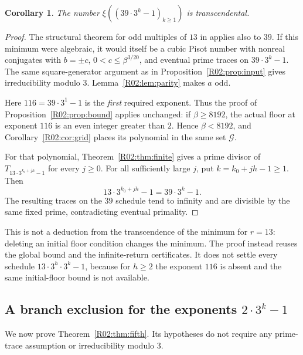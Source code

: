 \documentclass[11pt,a4paper]{article}
\newtheorem{corollary}[theorem]{Corollary}\newtheorem{mainthm}[theorem]{Theorem}
\theoremstyle{definition}\newtheorem{definition}[theorem]{Definition}
\theoremstyle{remark}\newtheorem{remark}[theorem]{Remark}
\begin{document}
\begin{corollary}\label{R02:cor:39}
The number $\xi((39\cdot3^k-1)_{k\ge1})$ is transcendental.
\end{corollary}
\begin{proof}
The structural theorem for odd multiples of $13$ in
\cite[Section~7.2]{K064} applies also to $39$. If this minimum were
algebraic, it would itself be a cubic Pisot number with nonreal conjugates with
$b=\pm c$, $0<c\le\beta^{3/20}$, and eventual prime traces on
$39\cdot3^k-1$. The same square-generator argument as in
Proposition~\ref{R02:prop:input} gives irreducibility modulo $3$.
Lemma~\ref{R02:lem:parity} makes $a$ odd.

Here $116=39\cdot3^1-1$ is the \emph{first} required exponent.
Thus the proof of Proposition~\ref{R02:prop:bound} applies unchanged:
if $\beta\ge8192$, the actual floor at exponent $116$ is an even
integer greater than $2$. Hence $\beta<8192$, and
Corollary~\ref{R02:cor:grid} places its polynomial in the same set
$\mathcal G$.

For that polynomial, Theorem~\ref{R02:thm:finite} gives a prime divisor
of $T_{13\cdot3^{k_0+jh}-1}$ for every $j\ge0$. For all sufficiently
large $j$, put $k=k_0+jh-1\ge1$. Then
\[
 13\cdot3^{k_0+jh}-1=39\cdot3^k-1.
\]
The resulting traces on the $39$ schedule tend to infinity and are
divisible by the same fixed prime, contradicting eventual primality.
\end{proof}

This is not a deduction from the transcendence of the minimum for
$r=13$: deleting an initial floor condition changes the minimum.
The proof instead reuses the global bound and the infinite-return
certificates. It does not settle every schedule
$13\cdot3^h\cdot3^k-1$, because for $h\ge2$ the exponent $116$ is
absent and the same initial-floor bound is not available.

\subsection{A branch exclusion for the exponents \texorpdfstring{$2\cdot3^k-1$}{2 times powers of three minus one}}
\label{R02:sec:r2}

We now prove Theorem~\ref{R02:thm:fifth}. Its hypotheses do not require
any prime-trace assumption or irreducibility modulo $3$.
\end{document}
